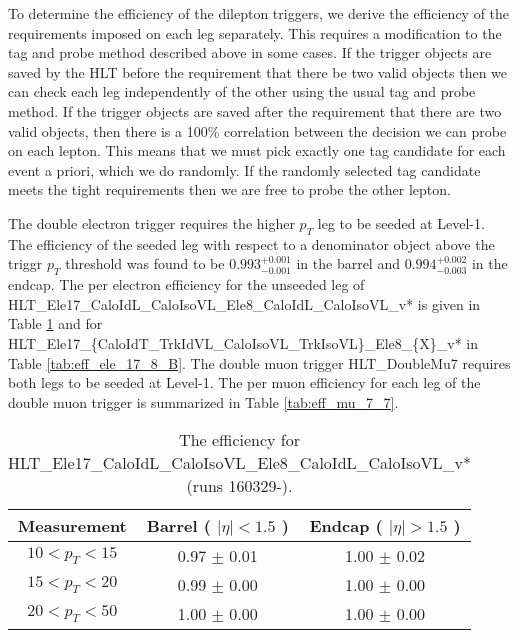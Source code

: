  
To determine the efficiency of the dilepton triggers, 
we derive the efficiency of the requirements imposed on each leg separately.
This requires a modification to the tag and probe method described above in some cases.
If the trigger objects are saved by the HLT before the requirement that there be two valid objects then
we can check each leg independently of the other using the usual tag and probe method.
If the trigger objects are saved after the requirement that there are two valid objects, then there is 
a 100\% correlation between the decision we can probe on each lepton.
This means that we must pick exactly one tag candidate for each event a priori, which we do 
randomly. 
If the randomly selected tag candidate meets the tight requirements then we are free to 
probe the other lepton.

The double electron trigger requires the higher $p_T$ leg to be seeded at Level-1.
The efficiency of the seeded leg with respect to a denominator object above the 
triggr $p_T$ threshold was found to be $0.993^{+0.001}_{-0.001}$ in the barrel and
$0.994^{+0.002}_{-0.003}$ in the endcap.
The per electron efficiency for the unseeded leg of 
HLT\_Ele17\_CaloIdL\_CaloIsoVL\_Ele8\_CaloIdL\_CaloIsoVL\_v*
is given in Table \ref{tab:eff_ele_17_8_A} and for\\
HLT\_Ele17\_\{CaloIdT\_TrkIdVL\_CaloIsoVL\_TrkIsoVL\}\_Ele8\_\{X\}\_v* in
Table \ref{tab:eff_ele_17_8_B}.
The double muon trigger {HLT\_DoubleMu7 } requires both legs to be seeded at Level-1.
The per muon efficiency for each leg of the double muon trigger is
summarized in Table \ref{tab:eff_mu_7_7}.

\begin{table}[!ht]
\begin{center}
\begin{tabular}{c|c|c}
\hline
Measurement & Barrel ( $|\eta|<1.5$ )   & Endcap ( $|\eta|>1.5$ )  \\ 
\hline
$  10<p_T<  15$ & 0.97 $\pm$ 0.01  & 1.00 $\pm$ 0.02  \\ \hline 
$  15<p_T<  20$ & 0.99 $\pm$ 0.00  & 1.00 $\pm$ 0.00  \\ \hline 
$  20<p_T<  50$ & 1.00 $\pm$ 0.00  & 1.00 $\pm$ 0.00  \\ \hline 
\end{tabular}
\caption{The efficiency for HLT\_Ele17\_CaloIdL\_CaloIsoVL\_Ele8\_CaloIdL\_CaloIsoVL\_v* (runs 160329-).}
\label{tab:eff_ele_17_8_A}
\end{center}
\end{table}

